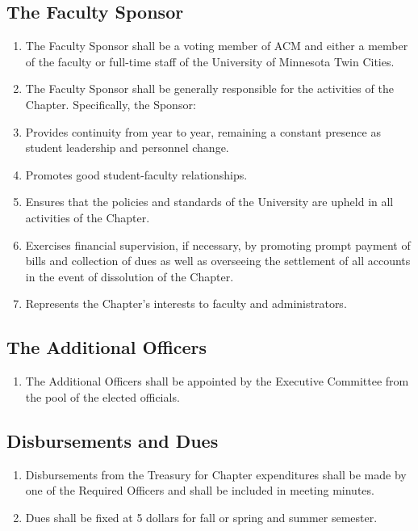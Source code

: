 \subsection{The Faculty Sponsor}
\begin{enumerate}
	\item The Faculty Sponsor shall be a voting member of ACM and either a member of the faculty or full-time staff of the University of Minnesota Twin Cities.
	\item The Faculty Sponsor shall be generally responsible for the activities of the Chapter. Specifically, the Sponsor:
	\item Provides continuity from year to year, remaining a constant presence as student leadership and personnel change.
	\item Promotes good student-faculty relationships.
	\item Ensures that the policies and standards of the University are upheld in all activities of the Chapter.
	\item Exercises financial supervision, if necessary, by promoting prompt payment of bills and collection of dues as well as overseeing the settlement of all accounts in the event of dissolution of the Chapter.
	\item Represents the Chapter’s interests to faculty and administrators.
\end{enumerate}

\subsection{The Additional Officers}
\begin{enumerate}
	\item The Additional Officers shall be appointed by the Executive Committee from the pool of the elected officials. 
\end{enumerate}

\subsection{Disbursements and Dues}
\begin{enumerate}
	\item Disbursements from the Treasury for Chapter expenditures shall be made by one of the Required Officers and shall be included in meeting minutes.
	\item Dues shall be fixed at 5 dollars for fall or spring and summer semester.
\end{enumerate}

